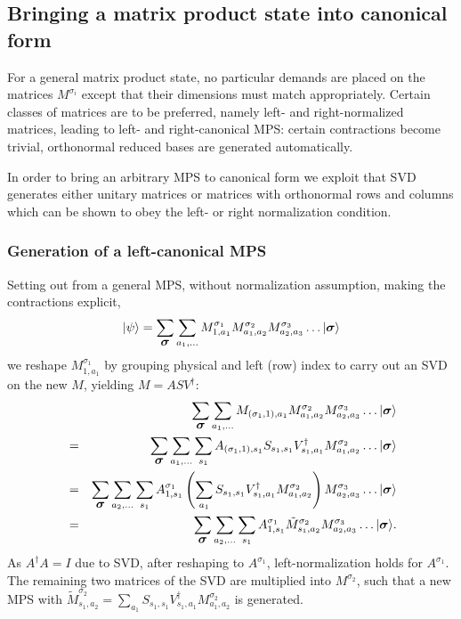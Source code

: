 \documentclass[a4paper,10pt,oneside,onecolumn,1p,times]{elsarticle}
\newcommand{\ket}[1]{\mbox{$| #1  \rangle$}}
\newcommand{\fat}[1]{\mbox{\boldmath$#1$\unboldmath}}	%
\begin{document}
\subsection{Bringing a matrix product state into canonical form}

For a general matrix product state, no particular demands are placed on the matrices $M^{\sigma_i}$ except that their dimensions must match appropriately. Certain classes of matrices are to be preferred, namely left- and right-normalized matrices, leading to left- and right-canonical MPS: certain contractions become trivial, orthonormal reduced bases are generated automatically.

In order to bring an arbitrary MPS to canonical form we exploit that SVD generates either unitary matrices or matrices with orthonormal rows and columns which can be shown to obey the left- or right normalization condition.

\subsubsection{Generation of a left-canonical MPS}
Setting out from a general MPS, without normalization assumption, making the contractions explicit,
\begin{equation}
\ket{\psi}= \sum_{\fat{\sigma}} \sum_{a_1,\ldots} M^{\sigma_ 1}_{1,a_1} M^{\sigma_2}_{a_1,a_2} M^{\sigma_3}_{a_2,a_3} \ldots \ket{\fat{\sigma}}
\end{equation}
we reshape $M^{\sigma_ 1}_{1,a_1}$ by grouping physical and left (row) index to carry out an SVD on the new $M$, yielding $M=ASV^\dagger$:
\begin{eqnarray}
& & \sum_{\fat{\sigma}} \sum_{a_1,\ldots} M_{(\sigma_ 1,1),a_1} M^{\sigma_2}_{a_1,a_2} M^{\sigma_3}_{a_2,a_3} \ldots \ket{\fat{\sigma}} \nonumber \\
&=&  \sum_{\fat{\sigma}} \sum_{a_1,\ldots} \sum_{s_1} A_{(\sigma_ 1,1),s_1} S_{s_1,s_1} V^\dagger_{s_1,a_1}  M^{\sigma_2}_{a_1,a_2}  \ldots \ket{\fat{\sigma}} \nonumber \\
&=& \sum_{\fat{\sigma}} \sum_{a_2,\ldots} \sum_{s_1} A^{\sigma_1}_{1,s_1} \left( \sum_{a_1} S_{s_1,s_1} V^\dagger_{s_1,a_1}  M^{\sigma_2}_{a_1,a_2} \right) M^{\sigma_3}_{a_2,a_3} \ldots \ket{\fat{\sigma}} \nonumber \\
&=& \sum_{\fat{\sigma}} \sum_{a_2,\ldots} \sum_{s_1} A^{\sigma_1}_{1,s_1} \tilde{M}^{\sigma_2}_{s_1,a_2} M^{\sigma_3}_{a_2,a_3} \ldots \ket{\fat{\sigma}} .
\end{eqnarray}
As $A^\dagger A = I$ due to SVD, after reshaping to $A^{\sigma_1}$, left-normalization holds for  $A^{\sigma_1}$. The remaining two matrices of the SVD are multiplied into $M^{\sigma_2}$, such that a new MPS with
$\tilde{M}^{\sigma_2}_{s_1,a_2} = \sum_{a_1} S_{s_1,s_1} V^\dagger_{s_1,a_1}  M^{\sigma_2}_{a_1,a_2}$ is generated. 
\end{document}
